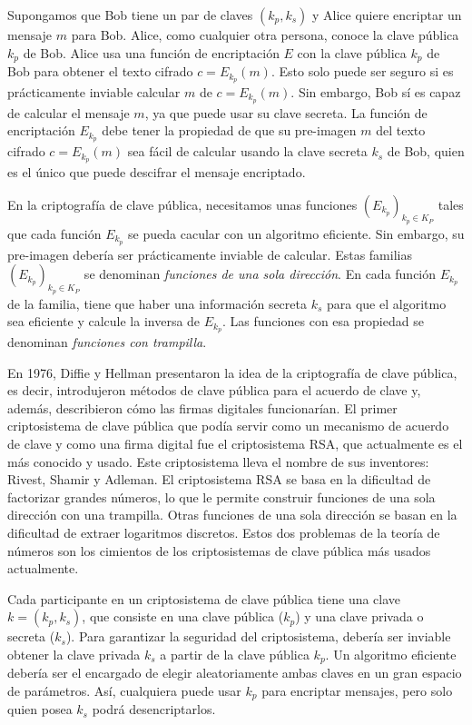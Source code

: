 Supongamos que Bob tiene un par de claves $(k_p, k_s)$ y Alice quiere encriptar un mensaje $m$ para Bob. Alice, como cualquier otra persona, conoce la clave pública $k_p$ de Bob. Alice usa una función de encriptación $E$ con la clave pública $k_p$ de Bob para obtener el texto cifrado $c = E_{k_p}(m)$. Esto solo puede ser seguro si es prácticamente inviable calcular $m$ de $c = E_{k_p}(m)$. Sin embargo, Bob sí es capaz de calcular el mensaje $m$, ya que puede usar su clave secreta. La función de encriptación $E_{k_p}$ debe tener la propiedad de que su pre-imagen $m$ del texto cifrado $c = E_{k_p}(m)$ sea fácil de calcular usando la clave secreta $k_s$ de Bob, quien es el único que puede descifrar el mensaje encriptado.

En la criptografía de clave pública, necesitamos unas funciones $\left( E_{k_p} \right)_{k_p \in K_P}$ tales que cada función $E_{k_p}$ se pueda cacular con un algoritmo eficiente. Sin embargo, su pre-imagen debería ser prácticamente inviable de calcular. Estas familias $\left( E_{k_p} \right)_{k_p \in K_P}$ se denominan \emph{funciones de una sola dirección}. En cada función $E_{k_p}$ de la familia, tiene que haber una información secreta $k_s$ para que el algoritmo sea eficiente y calcule la inversa de $E_{k_p}$. Las funciones con esa propiedad se denominan \emph{funciones con trampilla}.

En 1976, Diffie y Hellman \cite{Diffie_Hellman_1976} presentaron la idea de la criptografía de clave pública, es decir, introdujeron métodos de clave pública para el acuerdo de clave y, además, describieron cómo las firmas digitales funcionarían. El primer criptosistema de clave pública que podía servir como un mecanismo de acuerdo de clave y como una firma digital fue el criptosistema RSA, que actualmente es el más conocido y usado. Este criptosistema lleva el nombre de sus inventores: Rivest, Shamir y Adleman. El criptosistema RSA se basa en la dificultad de factorizar grandes números, lo que le permite construir funciones de una sola dirección con una trampilla. Otras funciones de una sola dirección se basan en la dificultad de extraer logaritmos discretos. Estos dos problemas de la teoría de números son los cimientos de los criptosistemas de clave pública más usados actualmente.

Cada participante en un criptosistema de clave pública tiene una clave $k = (k_p, k_s)$, que consiste en una clave pública ($k_p$) y una clave privada o secreta ($k_s$). Para garantizar la seguridad del criptosistema, debería ser inviable obtener la clave privada $k_s$ a partir de la clave pública $k_p$. Un algoritmo eficiente debería ser el encargado de elegir aleatoriamente ambas claves en un gran espacio de parámetros. Así, cualquiera puede usar $k_p$ para encriptar mensajes, pero solo quien posea $k_s$ podrá desencriptarlos.

